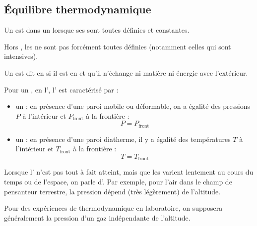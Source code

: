 \subsection{Équilibre thermodynamique}

\begin{definition}
Un  est dans un  lorsque ses  sont toutes définies et constantes.
\end{definition}

\begin{remarque}
Hors , les  ne sont pas forcément toutes définies (notamment celles qui sont intensives).
\end{remarque}

\begin{definition}
Un  est dit en  si il est en  et qu'il n'échange ni matière ni énergie avec l'extérieur.
\end{definition}

\begin{propriete}
Pour un , en l', l' est caractérisé par :

\begin{itemize}
\item un  : en présence d'une paroi mobile ou déformable, on a égalité des pressions $P$ à l'intérieur et $P_{\mathrm{front}}$ à la frontière :
\[P = P_{\mathrm{front}}\]

\item un  : en présence d'une paroi diatherme, il y a égalité des températures $T$ à l'intérieur et $T_{\mathrm{front}}$ à la frontière :
\[T = T_{\mathrm{front}}\]
\end{itemize}
\end{propriete}

\begin{remarque}
Lorsque l' n'est pas tout à fait atteint, mais que les  varient lentement au cours du temps ou de l'espace, on parle d'. Par exemple, pour l'air dans le champ de pensanteur terrestre, la pression dépend (très légèrement) de l'altitude.
\end{remarque}

\begin{propriete}
Pour des expériences de thermodynamique en laboratoire, on supposera généralement la pression d'un gaz indépendante de l'altitude.
\end{propriete}



